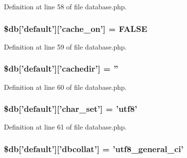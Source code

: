 Definition at line 58 of file database.\-php.

\hypertarget{development_2database_8php_a05a82adb11460f351c1df4ae9be71866}{
\subsubsection[{\$db}]{\setlength{\rightskip}{0pt plus 5cm}\$db\mbox{[}'default'\mbox{]}\mbox{[}'cache\-\_\-on'\mbox{]} = F\-A\-L\-S\-E}}\label{development_2database_8php_a05a82adb11460f351c1df4ae9be71866}


Definition at line 59 of file database.\-php.

\hypertarget{development_2database_8php_a12683252490249e3294aebaca97c4126}{
\subsubsection[{\$db}]{\setlength{\rightskip}{0pt plus 5cm}\$db\mbox{[}'default'\mbox{]}\mbox{[}'cachedir'\mbox{]} = ''}}\label{development_2database_8php_a12683252490249e3294aebaca97c4126}


Definition at line 60 of file database.\-php.

\hypertarget{development_2database_8php_a581bc2f1f3fa806239c44e2c2293dc59}{
\subsubsection[{\$db}]{\setlength{\rightskip}{0pt plus 5cm}\$db\mbox{[}'default'\mbox{]}\mbox{[}'char\-\_\-set'\mbox{]} = 'utf8'}}\label{development_2database_8php_a581bc2f1f3fa806239c44e2c2293dc59}


Definition at line 61 of file database.\-php.

\hypertarget{development_2database_8php_ab03697bf8340acfa74bf20c952aa81c7}{
\subsubsection[{\$db}]{\setlength{\rightskip}{0pt plus 5cm}\$db\mbox{[}'default'\mbox{]}\mbox{[}'dbcollat'\mbox{]} = 'utf8\-\_\-general\-\_\-ci'}}\label{development_2database_8php_ab03697bf8340acfa74bf20c952aa81c7}


